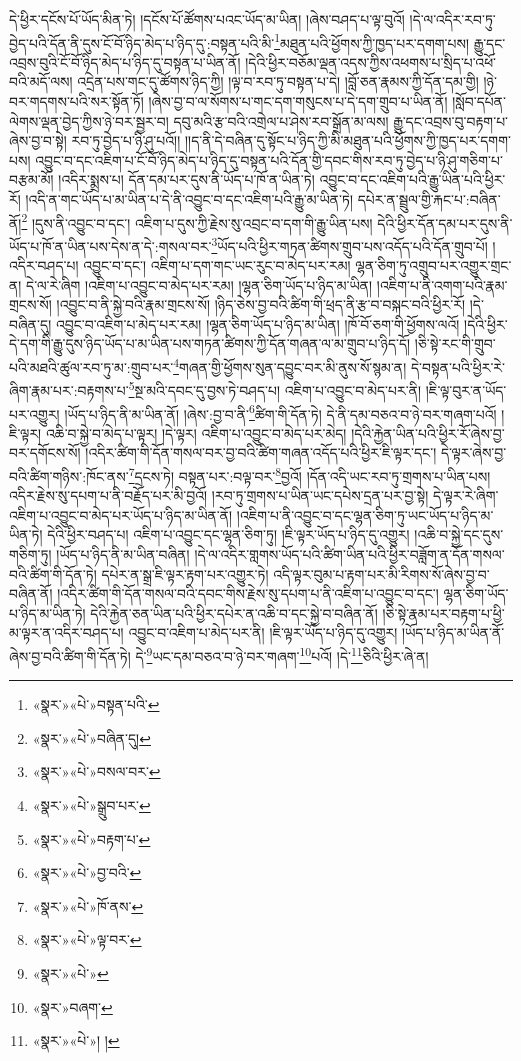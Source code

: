 དེ་ཕྱིར་དངོས་པོ་ཡོད་མིན་ཏེ། །དངོས་པོ་ཚོགས་པའང་ཡོད་མ་ཡིན། །ཞེས་བཤད་པ་ལྟ་བུའོ། །དེ་ལ་འདིར་རབ་ཏུ་བྱེད་པའི་དོན་ནི་དུས་ངོ་བོ་ཉིད་མེད་པ་ཉིད་དུ་:བསྟན་པའི་མི་\footnote{«སྣར་»«པེ་»བསྟན་པའི་}མཐུན་པའི་ཕྱོགས་ཀྱི་ཁྱད་པར་དགག་པས། རྒྱུ་དང་འབྲས་བུའི་ངོ་བོ་ཉིད་མེད་པ་ཉིད་དུ་བསྟན་པ་ཡིན་ནོ། །དེའི་ཕྱིར་བཅོམ་ལྡན་འདས་ཀྱིས་འཕགས་པ་སྲིད་པ་འཕོ་བའི་མདོ་ལས། འདྲེན་པས་གང་དུ་ཚོགས་ཉིད་ཀྱི། །ལྟ་བ་རབ་ཏུ་བསྟན་པ་དེ། །བློ་ཅན་རྣམས་ཀྱི་དོན་དམ་གྱི། །ཉེ་བར་གདགས་པའི་སར་སྟོན་ཏོ། །ཞེས་བྱ་བ་ལ་སོགས་པ་གང་དག་གསུངས་པ་དེ་དག་གྲུབ་པ་ཡིན་ནོ། །སློབ་དཔོན་ལེགས་ལྡན་བྱེད་ཀྱིས་ཉེ་བར་སྦྱར་བ། དབུ་མའི་རྩ་བའི་འགྲེལ་པ་ཤེས་རབ་སྒྲོན་མ་ལས། རྒྱུ་དང་འབྲས་བུ་བརྟག་པ་ཞེས་བྱ་བ་སྟེ། རབ་ཏུ་བྱེད་པ་ཉི་ཤུ་པའོ།། །།ད་ནི་དེ་བཞིན་དུ་སྟོང་པ་ཉིད་ཀྱི་མི་མཐུན་པའི་ཕྱོགས་ཀྱི་ཁྱད་པར་དགག་པས། འབྱུང་བ་དང་འཇིག་པ་ངོ་བོ་ཉིད་མེད་པ་ཉིད་དུ་བསྟན་པའི་དོན་གྱི་དབང་གིས་རབ་ཏུ་བྱེད་པ་ཉི་ཤུ་གཅིག་པ་བརྩམ་མོ། །འདིར་སྨྲས་པ། དོན་དམ་པར་དུས་ནི་ཡོད་པ་ཁོ་ན་ཡིན་ཏེ། འབྱུང་བ་དང་འཇིག་པའི་རྒྱུ་ཡིན་པའི་ཕྱིར་རོ། །འདི་ན་གང་ཡོད་པ་མ་ཡིན་པ་དེ་ནི་འབྱུང་བ་དང་འཇིག་པའི་རྒྱུ་མ་ཡིན་ཏེ། དཔེར་ན་སྦྲུལ་གྱི་རྐང་པ་:བཞིན་ནོ།\footnote{«སྣར་»«པེ་»བཞིན་དུ།} །དུས་ནི་འབྱུང་བ་དང་། འཇིག་པ་དུས་ཀྱི་རྗེས་སུ་འབྲང་བ་དག་གི་རྒྱུ་ཡིན་པས། དེའི་ཕྱིར་དོན་དམ་པར་དུས་ནི་ཡོད་པ་ཁོ་ན་ཡིན་པས་དེས་ན་དེ་:གསལ་བར་\footnote{«སྣར་»«པེ་»བསལ་བར་}ཡོད་པའི་ཕྱིར་གཏན་ཚིགས་གྲུབ་པས་འདོད་པའི་དོན་གྲུབ་པོ། །འདིར་བཤད་པ། འབྱུང་བ་དང་། འཇིག་པ་དག་གང་ཡང་རུང་བ་མེད་པར་རམ། ལྷན་ཅིག་ཏུ་འགྲུབ་པར་འགྱུར་གྲང་ན། དེ་ལ་རེ་ཞིག །འཇིག་པ་འབྱུང་བ་མེད་པར་རམ། །ལྷན་ཅིག་ཡོད་པ་ཉིད་མ་ཡིན། །འཇིག་པ་ནི་འགག་པའི་རྣམ་གྲངས་སོ། །འབྱུང་བ་ནི་སྐྱེ་བའི་རྣམ་གྲངས་སོ། །ཉིད་ཅེས་བྱ་བའི་ཚིག་གི་ཕྲད་ནི་རྩ་བ་བསྐང་བའི་ཕྱིར་རོ། །དེ་བཞིན་དུ། འབྱུང་བ་འཇིག་པ་མེད་པར་རམ། །ལྷན་ཅིག་ཡོད་པ་ཉིད་མ་ཡིན། །ཁོ་བོ་ཅག་གི་ཕྱོགས་ལའོ། །དེའི་ཕྱིར་དེ་དག་གི་རྒྱུ་དུས་ཉིད་ཡོད་པ་མ་ཡིན་པས་གཏན་ཚིགས་ཀྱི་དོན་གཞན་ལ་མ་གྲུབ་པ་ཉིད་དོ། །ཅི་སྟེ་རང་གི་གྲུབ་པའི་མཐའི་ཚུལ་རབ་ཏུ་མ་:གྲུབ་པར་\footnote{«སྣར་»«པེ་»སྒྲུབ་པར་}གཞན་གྱི་ཕྱོགས་སུན་དབྱུང་བར་མི་ནུས་སོ་སྙམ་ན། དེ་བསྟན་པའི་ཕྱིར་རེ་ཞིག་རྣམ་པར་:བརྟགས་པ་\footnote{«སྣར་»«པེ་»བརྟག་པ་}སྔ་མའི་དབང་དུ་བྱས་ཏེ་བཤད་པ། འཇིག་པ་འབྱུང་བ་མེད་པར་ནི། །ཇི་ལྟ་བུར་ན་ཡོད་པར་འགྱུར། །ཡོད་པ་ཉིད་ནི་མ་ཡིན་ནོ། །ཞེས་:བྱ་བ་ནི་\footnote{«སྣར་»«པེ་»བྱ་བའི་}ཚིག་གི་དོན་ཏེ། དེ་ནི་དམ་བཅའ་བ་ཉེ་བར་གཞག་པའོ། །ཇི་ལྟར། འཆི་བ་སྐྱེ་བ་མེད་པ་ལྟར། །དེ་ལྟར། འཇིག་པ་འབྱུང་བ་མེད་པར་མེད། །དེའི་རྐྱེན་ཡིན་པའི་ཕྱིར་རོ་ཞེས་བྱ་བར་དགོངས་སོ། །འདིར་ཚིག་གི་དོན་གསལ་བར་བྱ་བའི་ཚིག་གཞན་འདོད་པའི་ཕྱིར་ཇི་ལྟར་དང་། དེ་ལྟར་ཞེས་བྱ་བའི་ཚིག་གཉིས་:ཁོང་ནས་\footnote{«སྣར་»«པེ་»ཁོ་ནས་}དྲངས་ཏེ། བསྟན་པར་:བལྟ་བར་\footnote{«སྣར་»«པེ་»ལྟ་བར་}བྱའོ། །དོན་འདི་ཡང་རབ་ཏུ་གྲགས་པ་ཡིན་པས། འདིར་རྗེས་སུ་དཔག་པ་ནི་བརྗོད་པར་མི་བྱའོ། །རབ་ཏུ་གྲགས་པ་ཡིན་ཡང་དཔེས་དྲན་པར་བྱ་སྟེ། དེ་ལྟར་རེ་ཞིག་འཇིག་པ་འབྱུང་བ་མེད་པར་ཡོད་པ་ཉིད་མ་ཡིན་ནོ། །འཇིག་པ་ནི་འབྱུང་བ་དང་ལྷན་ཅིག་ཏུ་ཡང་ཡོད་པ་ཉིད་མ་ཡིན་ཏེ། དེའི་ཕྱིར་བཤད་པ། འཇིག་པ་འབྱུང་དང་ལྷན་ཅིག་ཏུ། །ཇི་ལྟར་ཡོད་པ་ཉིད་དུ་འགྱུར། །འཆི་བ་སྐྱེ་དང་དུས་གཅིག་ཏུ། །ཡོད་པ་ཉིད་ནི་མ་ཡིན་བཞིན། །དེ་ལ་འདིར་གླགས་ཡོད་པའི་ཚིག་ཡིན་པའི་ཕྱིར་བཟློག་ན་དོན་གསལ་བའི་ཚིག་གི་དོན་ཏེ། དཔེར་ན་སྒྲ་ཇི་ལྟར་རྟག་པར་འགྱུར་ཏེ། འདི་ལྟར་བུམ་པ་རྟག་པར་མི་རིགས་སོ་ཞེས་བྱ་བ་བཞིན་ནོ། །འདིར་ཚིག་གི་དོན་གསལ་བའི་དབང་གིས་རྗེས་སུ་དཔག་པ་ནི་འཇིག་པ་འབྱུང་བ་དང་། ལྷན་ཅིག་ཡོད་པ་ཉིད་མ་ཡིན་ཏེ། དེའི་རྐྱེན་ཅན་ཡིན་པའི་ཕྱིར་དཔེར་ན་འཆི་བ་དང་སྐྱེ་བ་བཞིན་ནོ། །ཅི་སྟེ་རྣམ་པར་བརྟག་པ་ཕྱི་མ་ལྟར་ན་འདིར་བཤད་པ། འབྱུང་བ་འཇིག་པ་མེད་པར་ནི། །ཇི་ལྟར་ཡོད་པ་ཉིད་དུ་འགྱུར། །ཡོད་པ་ཉིད་མ་ཡིན་ནོ་ཞེས་བྱ་བའི་ཚིག་གི་དོན་ཏེ། དེ་\footnote{«སྣར་»«པེ་»}ཡང་དམ་བཅའ་བ་ཉེ་བར་གཞག་\footnote{«སྣར་»བཞག་}པའོ། །དེ་\footnote{«སྣར་»«པེ་»། །}ཅིའི་ཕྱིར་ཞེ་ན། 
